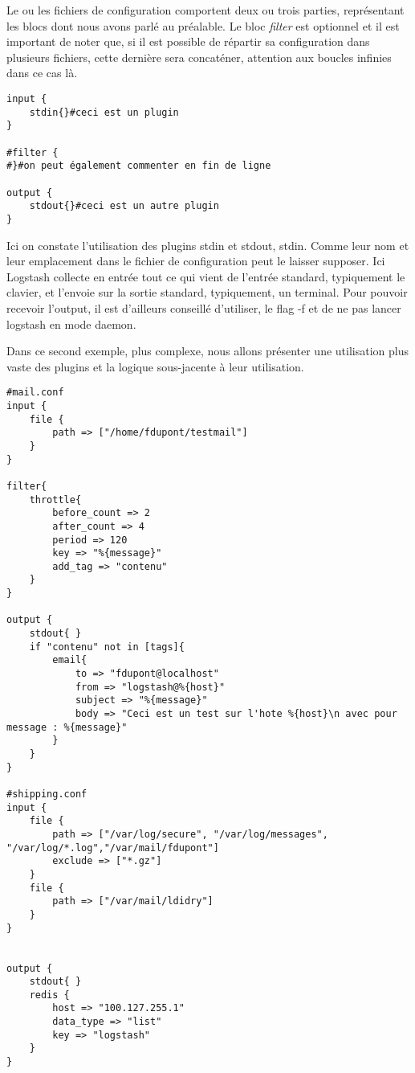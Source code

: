 Le ou les fichiers de configuration comportent deux ou trois parties, représentant 
les blocs dont nous avons parlé au préalable. Le bloc \emph{filter} est optionnel
et il est important de noter que, si il est possible de répartir sa configuration
dans plusieurs fichiers, cette dernière sera concaténer, attention aux boucles infinies
dans ce cas là.

\begin{lstlisting}[style=logstash,label={lst:conflogstashminimale},caption={Configuration minimale}]
input {
    stdin{}#ceci est un plugin
}

#filter {
#}#on peut également commenter en fin de ligne

output {
    stdout{}#ceci est un autre plugin
}
\end{lstlisting}

Ici on constate l'utilisation des plugins stdin et stdout, stdin. Comme leur nom 
et leur emplacement dans le fichier de configuration peut le laisser supposer.
Ici Logstash collecte en entrée tout ce qui vient de l'entrée standard, typiquement
le clavier, et l'envoie sur la sortie standard, typiquement, un terminal.
Pour pouvoir recevoir l'output, il est d'ailleurs conseillé d'utiliser, le flag -f
et de ne pas lancer logstash en mode daemon.

Dans ce second exemple, plus complexe, nous allons présenter une utilisation plus
vaste des plugins et la logique sous-jacente à leur utilisation.

\begin{lstlisting}[style=logstash,label={lst:conflogstashiniteloop},caption={Infinite loop}]
#mail.conf
input {
    file {
        path => ["/home/fdupont/testmail"]
    }
}

filter{
    throttle{
        before_count => 2
        after_count => 4
        period => 120
        key => "%{message}"
        add_tag => "contenu"
    }
}

output {
    stdout{ }
    if "contenu" not in [tags]{
        email{
            to => "fdupont@localhost"
            from => "logstash@%{host}"
            subject => "%{message}"
            body => "Ceci est un test sur l'hote %{host}\n avec pour message : %{message}"
        }
    }
}

#shipping.conf
input {
    file {
        path => ["/var/log/secure", "/var/log/messages", "/var/log/*.log","/var/mail/fdupont"]
        exclude => ["*.gz"]
    }
    file {
        path => ["/var/mail/ldidry"]
    }
}


output {
    stdout{ }
    redis {
        host => "100.127.255.1"
        data_type => "list"
        key => "logstash"
    }
}
\end{lstlisting}

